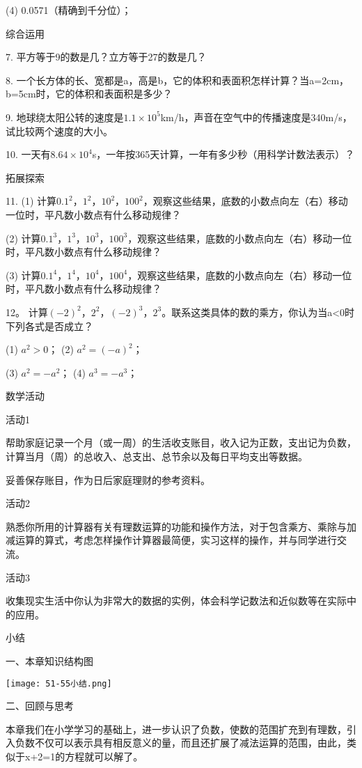 \documentclass{article}
\begin{document}
\begin{article}
\begin{exeicise}
    (4) 0.0571（精确到千分位）；

综合运用

7. 平方等于9的数是几？立方等于27的数是几？

8. 一个长方体的长、宽都是a，高是b，它的体积和表面积怎样计算？当a=2cm，b=5cm时，它的体积和表面积是多少？

9. 地球绕太阳公转的速度是$1.1\times 10^5$km/h，声音在空气中的传播速度是340m/s，试比较两个速度的大小。

10. 一天有$8.64 \times 10^4$s，一年按365天计算，一年有多少秒（用科学计数法表示）？

拓展探索

11. (1) 计算$0.1^2$，$1^2$，$10^2$，$100^2$，观察这些结果，底数的小数点向左（右）移动一位时，平凡数小数点有什么移动规律？

    (2) 计算$0.1^3$，$1^3$，$10^3$，$100^3$，观察这些结果，底数的小数点向左（右）移动一位时，平凡数小数点有什么移动规律？

    (3) 计算$0.1^4$，$1^4$，$10^4$，$100^4$，观察这些结果，底数的小数点向左（右）移动一位时，平凡数小数点有什么移动规律？

12。 计算${(-2)}^2$，$2^2$，${(-2)}^3$，$2^3$。联系这类具体的数的乘方，你认为当a<0时下列各式是否成立？

    (1) $a^2>0$；       (2) $a^2={(-a)}^2$；
    
    (3) $a^2=-a^2$；    (4) $a^3=-a^3$；

\end{exeicise}

数学活动

活动1

帮助家庭记录一个月（或一周）的生活收支账目，收入记为正数，支出记为负数，计算当月（周）的总收入、总支出、总节余以及每日平均支出等数据。

妥善保存账目，作为日后家庭理财的参考资料。

活动2

熟悉你所用的计算器有关有理数运算的功能和操作方法，对于包含乘方、乘除与加减运算的算式，考虑怎样操作计算器最简便，实习这样的操作，并与同学进行交流。

活动3 

收集现实生活中你认为非常大的数据的实例，体会科学记数法和近似数等在实际中的应用。

小结

一、本章知识结构图

\texttt{[image: 51-55小结.png]}

二、回顾与思考

本章我们在小学学习的基础上，进一步认识了负数，使数的范围扩充到有理数，引入负数不仅可以表示具有相反意义的量，而且还扩展了减法运算的范围，由此，类似于x+2=1的方程就可以解了。


\end{article}
\end{document}
